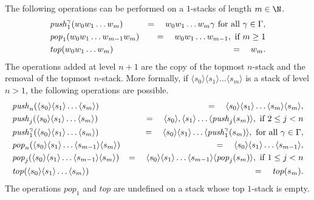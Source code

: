The following operations can be performed on a $1$-stacks of length $m \in \N$.
\begin{eqnarray*}
&\text{\textit{push}}_1^\gamma( w_0 w_1 \ldots w_m) &=\quad w_0 w_1 \ldots w_m \gamma   \text{ for all } \gamma \in  \Gamma, \\
&\text{\textit{pop}}_1(w_0 w_1 \ldots w_{m-1} w_m ) &=\quad w_0 w_1 \ldots w_{m-1}, \text{ if } m \geq 1\\
&\text{\textit{top}}( w_0 w_1 \ldots w_m ) &=\quad w_m.
\end{eqnarray*}
The operations added at level $n+1$ are the copy of the topmost $n$-stack
and the removal of the topmost $n$-stack.
More formally, if $ \langle s_0 \rangle \langle s_1 \rangle \ldots \langle s_m \rangle$ is a stack of 
level $n > 1$, 
the following operations are possible.
%
\begin{eqnarray*}
&\text{\textit{push}}_n( \langle s_0 \rangle \langle s_1 \rangle \ldots \langle s_m \rangle) &=\quad  \langle s_0 \rangle \langle s_1 \rangle \ldots \langle s_m \rangle \langle s_m \rangle , \\
&\text{\textit{push}}_j( \langle s_0 \rangle \langle s_1 \rangle \ldots \langle s_m \rangle) &=\quad \langle s_0 \rangle, \langle s_1 \rangle \ldots 
\langle \text{\textit{push}}_j(s_m) \rangle,
\text{ if } 2 \leq j < n\\
&\text{\textit{push}}_1^\gamma( \langle s_0 \rangle \langle s_1 \rangle \ldots \langle s_m \rangle) &= \quad
\langle s_0 \rangle \langle s_1 \rangle \ldots 
\langle \text{\textit{push}}_1^\gamma(s_m) \rangle,
\text{ for all } \gamma \in \Gamma,\\
&\text{\textit{pop}}_n( \langle s_0 \rangle \langle s_1 \rangle \ldots \langle s_{m-1} \rangle \langle s_m \rangle) &= \quad
\langle s_0 \rangle \langle s_1 \rangle \ldots \langle s_{m-1} \rangle
,\\
&\text{\textit{pop}}_j( \langle s_0 \rangle \langle s_1 \rangle \ldots \langle s_{m-1} \rangle \langle s_m \rangle) &= \quad
\langle s_0 \rangle \langle s_1 \rangle \ldots \langle s_{m-1} \rangle
\langle \text{\textit{pop}}_j(s_m) \rangle,
\text{ if } 1 \leq j < n\\
&\text{\textit{top}}( \langle s_0 \rangle \langle s_1 \rangle \ldots \langle s_m \rangle) &=\quad
\text{\textit{top}}(s_m).
\end{eqnarray*}
The operations $pop_1$ and $top$ are undefined on a stack whose top $1$-stack is empty.  \\


